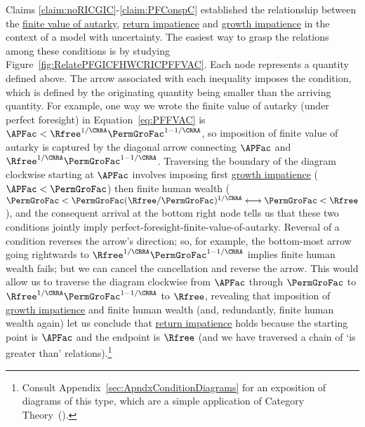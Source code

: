 \documentclass[BufferStockTheory]{subfiles}
\begin{document}
Claims \ref{claim:noRICGIC}-\ref{claim:PFConspC} established the relationship between the \hyperlink{PFFVAC}{finite value of autarky}, \hyperlink{RIC}{return impatience} and \hyperlink{GIC}{growth impatience} in the context of a model with uncertainty.
The easiest way to grasp the relations among these conditions is by studying Figure~\ref{fig:RelatePFGICFHWCRICPFFVAC}.
Each node represents a quantity defined above.
The arrow associated with each inequality imposes the condition, which is defined by the originating quantity being smaller than the arriving quantity.
For example, one way we wrote the \hypertarget{PFFVAC}{finite value of autarky} (under perfect foresight) in Equation~\eqref{eq:PFFVAC} is $\APFac < \Rfree^{1/\CRRA} \PermGroFac^{1-1/\CRRA}$, so imposition of \hypertarget{PFFVAC}{finite value of autarky} is captured by the diagonal arrow connecting $\APFac$ and $\Rfree^{1/\CRRA}\PermGroFac^{1-1/\CRRA}$.
Traversing the boundary of the diagram clockwise starting at $\APFac$ involves imposing first \hyperlink{GIC}{growth impatience} ($\APFac < \PermGroFac$) then \hypertarget{FHWC}{finite human wealth} ($\PermGroFac < \PermGroFac(\Rfree/\PermGroFac)^{1/\CRRA} \longleftrightarrow \PermGroFac < \Rfree $), and the consequent arrival at the bottom right node tells us that these two conditions jointly imply \hypertarget{PFFVAC}{perfect-foresight-finite-value-of-autarky}.
Reversal of a condition reverses the arrow's direction; so, for example, the bottom-most arrow going rightwards to $\Rfree^{1/\CRRA}\PermGroFac^{1-1/\CRRA}$ implies  \hypertarget{FHWC}{finite human wealth} fails; but we can cancel the cancellation and reverse the arrow.
This would allow us to traverse the diagram clockwise from $\APFac$  through $\PermGroFac$ to $\Rfree^{1/\CRRA}\PermGroFac^{1-1/\CRRA}$ to $\Rfree$, revealing that imposition of \hyperlink{GIC}{growth impatience} and \hypertarget{FHWC}{finite human wealth} (and, redundantly, \hypertarget{FHWC}{finite human wealth} again) let us conclude that \hyperlink{RIC}{return impatience} holds because the starting point is $\APFac$ and the endpoint is $\Rfree$ (and we have traversed a chain of `is greater than' relations).\footnote{Consult Appendix~\ref{sec:ApndxConditionDiagrams} for an exposition of diagrams of this type, which are a simple application of Category Theory~(\cite{riehl2017category}).}

\renewcommand{\figName}{RelatePFGICFHWCRICPFFVAC} 
\hypertarget{\figName}{}
\end{document}
